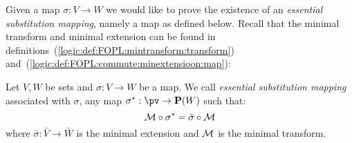 Given a map $\sigma:V\to W$ we would like to prove the existence of
an {\em essential substitution mapping}, namely a map as defined
below. Recall that the  minimal transform and minimal extension can
be found in
definitions~(\ref{logic:def:FOPL:mintransform:transform})
and~(\ref{logic:def:FOPL:commute:minextensioon:map}):
\begin{defin}\label{logic:def:FOPL:esssubst:esssubst}
Let $V,W$ be sets and $\sigma:V\to W$ be a map. We call {\em
essential substitution mapping} associated with $\sigma$, any map
$\sigma^{*}:\pv\to{\bf P}(W)$ such that:
    \begin{equation}\label{logic:eqn:FOPL:esssubst:key}
    {\cal M}\circ\sigma^{*}=\bar{\sigma}\circ{\cal M}
    \end{equation}
where $\bar{\sigma}:\bar{V}\to\bar{W}$ is the minimal extension and
${\cal M}$ is the minimal transform.
\end{defin}

